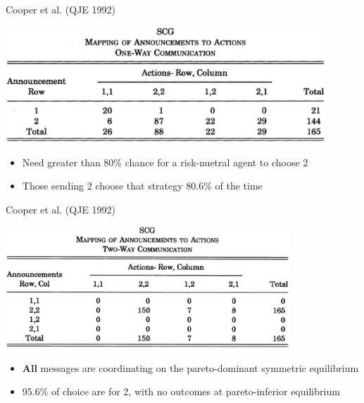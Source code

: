 \documentclass{beamer}
\begin{document}
\begin{frame}{Cooper et al. (QJE 1992)}
\begin{card}
\begin{center}\includegraphics[width=0.9\textwidth]{./i/cdfr1992Tbl2.eps}\end{center}
\end{card}
\begin{card}
	\begin{itemize}
		\item Need greater than 80\% chance for a risk-nuetral agent to choose $2$
		\item Those sending $2$ choose that strategy 80.6\% of the time
	\end{itemize}
\end{card}
\end{frame}

\begin{frame}{Cooper et al. (QJE 1992)}
\begin{card}
\begin{center}\includegraphics[width=0.8\textwidth]{./i/cdfr1992Tbl3.eps}\end{center}
\end{card}
    \begin{card}
    	\begin{itemize}
    		\item \textbf{All} messages are coordinating on the pareto-dominant symmetric equilibrium
    		\item 95.6\% of choice are for 2, with no outcomes at pareto-inferior equilibrium
    	\end{itemize}
    \end{card}
\end{frame}
\end{document}
